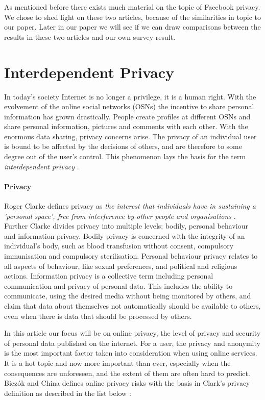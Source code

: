 As mentioned before there exists much material on the topic of Facebook privacy. We chose to shed light on these two articles, because of the similarities in topic to our paper. Later in our paper we will see if we can draw comparisons between the results in these two articles and our own survey result.

\section{Interdependent Privacy}
\label{sec:intpriv}
In today's society Internet is no longer a privilege, it is a human right. With the evolvement of the online social networks (OSNs) the incentive to share personal information has grown drastically. People create profiles at different OSNs and share personal information, pictures and comments with each other. With the enormous data sharing, privacy concerns arise. The privacy of an individual user is bound to be affected by the decisions of others, and are therefore to some degree out of the user's control. This phenomenon lays the basis for the term \textit{interdependent privacy} \cite{InterdependetPriv}. 

\paragraph{Privacy}
Roger Clarke defines privacy as \textit{the interest that individuals have in sustaining a 'personal space', free from interference by other people and organisations} \cite{privacy}. Further Clarke divides privacy into multiple levels; bodily, personal behaviour and information privacy. Bodily privacy is concerned with the integrity of an individual's body, such as blood transfusion without consent, compulsory immunisation and compulsory sterilisation. Personal behaviour privacy relates to all aspects of behaviour, like sexual preferences, and political and religious actions. Information privacy is a collective term including personal communication and privacy of personal data. This includes the ability to communicate, using the desired media without being monitored by others, and claim that data about themselves not automatically should be available to others, even when there is data that should be processed by others.

In this article our focus will be on online privacy, the level of privacy and security of personal data published on the internet. For a user, the privacy and anonymity is the most important factor taken into consideration when using online services. It is a hot topic and now more important than ever, especially when the consequences are unforeseen, and the extent of them are often hard to predict. Biczók and China defines online privacy risks with the basis in Clark's privacy definition as described in the list below \cite{InterdependetPriv}:

